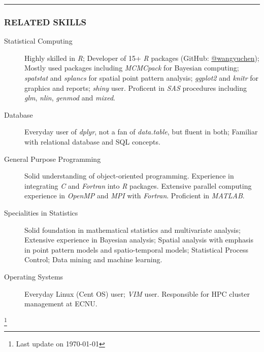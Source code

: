 \documentclass[11pt]{article}
\newcommand{\CPP}
{C\nolinebreak[4]\hspace{-.05em}\raisebox{.22ex}{\footnotesize\bf ++}}
\begin{document}
	\vspace{0.2em}
	\hrule

	\subsubsection*{\centering RELATED SKILLS}
	\vspace{-.3em}

	\begin{description}
		\item[Statistical Computing] Highly skilled in \emph{R}; Developer of 15+ \emph{R}
		packages (GitHub: \href{https://www.github.com/wangyuchen}{@wangyuchen});
		Mostly used packages including \emph{MCMCpack} for Bayesian computing; \emph{spatstat} and \emph{splancs} for spatial point pattern analysis; \emph{ggplot2} and \emph{knitr} for graphics and reports; \emph{shiny} user. Proficent in \emph{SAS} procedures including \emph{glm}, \emph{nlin}, \emph{genmod} and \emph{mixed}.
		\item[Database] Everyday user of \emph{dplyr}, not a fan of \emph{data.table}, but fluent in both;  Familiar with relational database and SQL concepts.
		\item[General Purpose Programming] Solid understanding of object-oriented programming. Experience in integrating \emph{\CPP} and \emph{Fortran} into \emph{R} packages. Extensive parallel computing experience in \emph{OpenMP} and \emph{MPI} with \emph{Fortran}. Proficient in \emph{MATLAB}.
		\item[Specialities in Statistics] Solid foundation in mathematical statistics and multivariate analysis; Extensive experience in Bayesian analysis; Spatial analysis with emphasis in point pattern models and spatio-temporal models; Statistical Process Control; Data mining and machine learning.
		\item[Operating Systems] Everyday Linux (Cent OS) user; \emph{VIM} user. Responsible for HPC cluster management at ECNU.
	\end{description}


\let\thefootnote\relax\footnote{Last update on \today}
\end{document}
